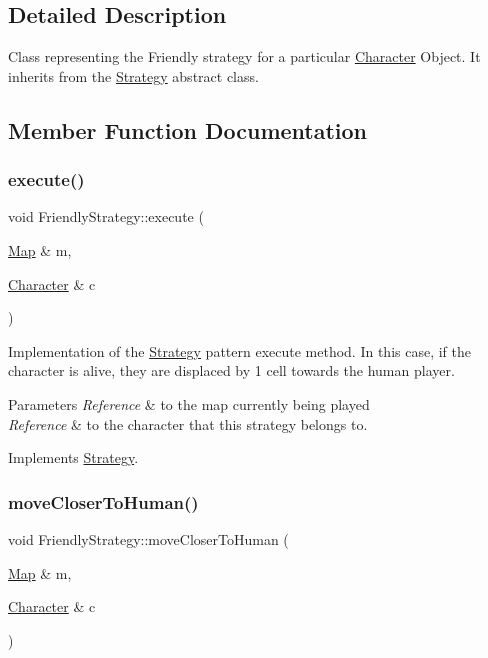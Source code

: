 \subsection{Detailed Description}
Class representing the Friendly strategy for a particular \hyperlink{classCharacter}{Character} Object. It inherits from the \hyperlink{classStrategy}{Strategy} abstract class. 

\subsection{Member Function Documentation}
\hypertarget{classFriendlyStrategy_a0d09aaf92d63050e081d0509683d073d}{}\label{classFriendlyStrategy_a0d09aaf92d63050e081d0509683d073d} 
\subsubsection{\texorpdfstring{execute()}{execute()}}
{\footnotesize\ttfamily void Friendly\+Strategy\+::execute (\begin{DoxyParamCaption}\item[{\hyperlink{classMap}{Map} \&}]{m,  }\item[{\hyperlink{classCharacter}{Character} \&}]{c }\end{DoxyParamCaption})\hspace{0.3cm}{\ttfamily [virtual]}}

Implementation of the \hyperlink{classStrategy}{Strategy} pattern execute method. In this case, if the character is alive, they are displaced by 1 cell towards the human player. 
\begin{DoxyParams}{Parameters}
{\em Reference} & to the map currently being played \\
\hline
{\em Reference} & to the character that this strategy belongs to. \\
\hline
\end{DoxyParams}


Implements \hyperlink{classStrategy}{Strategy}.

\hypertarget{classFriendlyStrategy_a0fe250c462da3ba3bfb3b4f7ea73a4d9}{}\label{classFriendlyStrategy_a0fe250c462da3ba3bfb3b4f7ea73a4d9} 
\subsubsection{\texorpdfstring{move\+Closer\+To\+Human()}{moveCloserToHuman()}}
{\footnotesize\ttfamily void Friendly\+Strategy\+::move\+Closer\+To\+Human (\begin{DoxyParamCaption}\item[{\hyperlink{classMap}{Map} \&}]{m,  }\item[{\hyperlink{classCharacter}{Character} \&}]{c }\end{DoxyParamCaption})}

